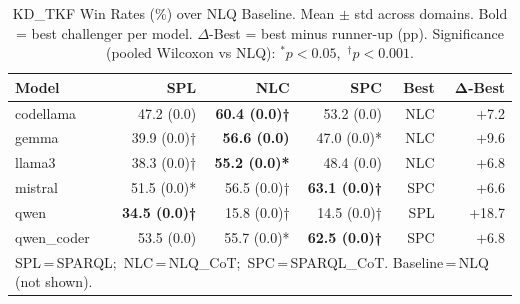 \begin{table}[t]
\centering
\small
\caption{KD\_TKF Win Rates (\%) over NLQ Baseline. Mean $\pm$ std across domains. Bold = best challenger per model. $\Delta$-Best = best minus runner-up (pp). Significance (pooled Wilcoxon vs NLQ): $^{*}p{<}0.05$,\ $^{\dagger}p{<}0.001$.}
\label{tab:rq1_winrates}
\setlength{\tabcolsep}{5pt}
\begin{tabular}{lrrrrr}
\toprule
\textbf{Model} & \textbf{SPL} & \textbf{NLC} & \textbf{SPC} & \textbf{Best} & $\boldsymbol{\Delta}$\textbf{-Best} \\
\midrule
codellama & 47.2 (0.0) & \textbf{60.4 (0.0)†} & 53.2 (0.0) & NLC & +7.2 \\
gemma & 39.9 (0.0)† & \textbf{56.6 (0.0)} & 47.0 (0.0)* & NLC & +9.6 \\
llama3 & 38.3 (0.0)† & \textbf{55.2 (0.0)*} & 48.4 (0.0) & NLC & +6.8 \\
mistral & 51.5 (0.0)* & 56.5 (0.0)† & \textbf{63.1 (0.0)†} & SPC & +6.6 \\
qwen & \textbf{34.5 (0.0)†} & 15.8 (0.0)† & 14.5 (0.0)† & SPL & +18.7 \\
qwen_coder & 53.5 (0.0) & 55.7 (0.0)* & \textbf{62.5 (0.0)†} & SPC & +6.8 \\
\bottomrule
\multicolumn{6}{l}{\footnotesize SPL\,=\,SPARQL;\  NLC\,=\,NLQ\_CoT;\  SPC\,=\,SPARQL\_CoT. Baseline\,=\,NLQ (not shown).} \\
\end{tabular}
\end{table}